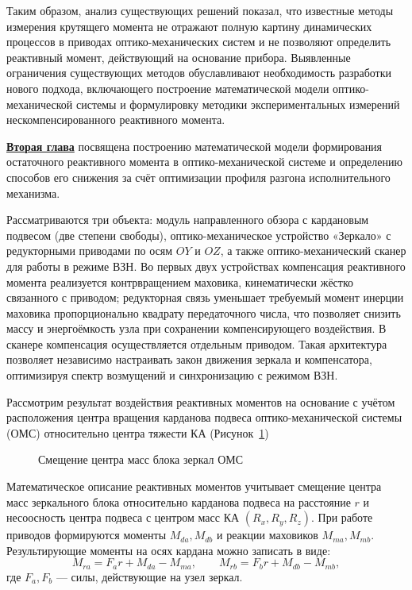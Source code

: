 Таким образом, анализ существующих решений показал, что известные методы измерения крутящего момента не отражают полную картину динамических процессов в приводах оптико-механических систем и не позволяют определить реактивный момент, действующий на основание прибора.
Выявленные ограничения существующих методов обуславливают необходимость разработки нового подхода, включающего построение математической модели оптико-механической системы и формулировку методики экспериментальных измерений нескомпенсированного реактивного момента.


\underline{\textbf{Вторая глава}} посвящена построению математической модели формирования остаточного реактивного момента в оптико-механической системе и определению способов его снижения за счёт оптимизации профиля разгона исполнительного механизма.

Рассматриваются три объекта: модуль направленного обзора с кардановым подвесом (две степени свободы), оптико-механическое устройство «Зеркало» с редукторными приводами по осям $OY$ и $OZ$, а также оптико-механический сканер для работы в режиме ВЗН. Во первых двух устройствах компенсация реактивного момента реализуется контрвращением маховика, кинематически жёстко связанного с приводом; редукторная связь уменьшает требуемый момент инерции маховика пропорционально квадрату передаточного числа, что позволяет снизить массу и энергоёмкость узла при сохранении компенсирующего воздействия. В сканере компенсация осуществляется отдельным приводом. Такая архитектура позволяет независимо настраивать закон движения зеркала и компенсатора, оптимизируя спектр возмущений и синхронизацию с режимом ВЗН.

Рассмотрим результат воздействия реактивных моментов на основание с учётом расположения центра вращения карданова подвеса оптико-механической системы (ОМС) относительно центра тяжести КА (Рисунок~\cref{fig:tikz_YPK})
\begin{figure}[h!]
	\legend{}
	\caption[Пример \texttt{tikz} схемы]{Смещение центра масс блока зеркал ОМС}\label{fig:tikz_YPK}
\end{figure}

Математическое описание реактивных моментов учитывает смещение центра масс зеркального блока относительно карданова подвеса на расстояние $r$ и несоосность центра подвеса с центром масс КА $(R_x,R_y,R_z)$. При работе приводов формируются моменты $M_{da}, M_{db}$ и реакции маховиков $M_{ma}, M_{mb}$. Результирующие моменты на осях кардана можно записать в виде:
\begin{equation*}
	M_{ra} = F_a r + M_{da} - M_{ma}, 
	\qquad 
	M_{rb} = F_b r + M_{db} - M_{mb},
\end{equation*}
где $F_a, F_b$ --- силы, действующие на узел зеркал. 

